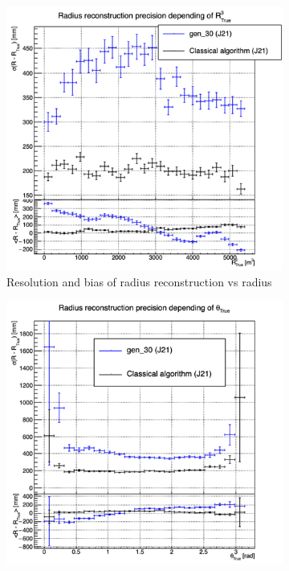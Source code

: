 \documentclass[../main.tex]{subfiles}
\begin{document}
\begin{figure}[ht]
  \begin{subfigure}[t]{0.32\linewidth}
    \centering
    \includegraphics[width=\linewidth]{images/jcnn/vic_cnn/multi_vic_cnn_MSBvRTC.png}
    \caption{Resolution and bias of radius reconstruction vs radius}
    \label{fig:jcnn:vic_cnn:multi_vic_cnn_MSBvRTC}
  \end{subfigure}
  \begin{subfigure}[t]{0.32\linewidth}
    \centering
    \includegraphics[width=\linewidth]{images/jcnn/vic_cnn/multi_vic_cnn_MSBvTTC.png}

\end{subfigure}
\end{figure}
\end{document}

